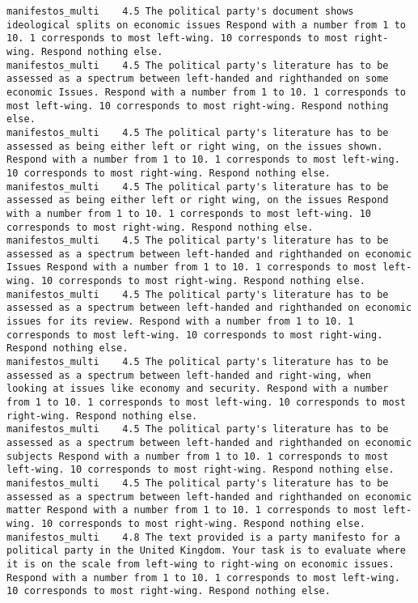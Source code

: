 \begin{lstlisting}[label=lst:promptvariants]
manifestos_multi	4.5	The political party's document shows ideological splits on economic issues Respond with a number from 1 to 10. 1 corresponds to most left-wing. 10 corresponds to most right-wing. Respond nothing else.
manifestos_multi	4.5	The political party's literature has to be assessed as a spectrum between left-handed and righthanded on some economic Issues. Respond with a number from 1 to 10. 1 corresponds to most left-wing. 10 corresponds to most right-wing. Respond nothing else.
manifestos_multi	4.5	The political party's literature has to be assessed as being either left or right wing, on the issues shown. Respond with a number from 1 to 10. 1 corresponds to most left-wing. 10 corresponds to most right-wing. Respond nothing else.
manifestos_multi	4.5	The political party's literature has to be assessed as being either left or right wing, on the issues Respond with a number from 1 to 10. 1 corresponds to most left-wing. 10 corresponds to most right-wing. Respond nothing else.
manifestos_multi	4.5	The political party's literature has to be assessed as a spectrum between left-handed and righthanded on economic Issues Respond with a number from 1 to 10. 1 corresponds to most left-wing. 10 corresponds to most right-wing. Respond nothing else.
manifestos_multi	4.5	The political party's literature has to be assessed as a spectrum between left-handed and righthanded on economic issues for its review. Respond with a number from 1 to 10. 1 corresponds to most left-wing. 10 corresponds to most right-wing. Respond nothing else.
manifestos_multi	4.5	The political party's literature has to be assessed as a spectrum between left-handed and right-wing, when looking at issues like economy and security. Respond with a number from 1 to 10. 1 corresponds to most left-wing. 10 corresponds to most right-wing. Respond nothing else.
manifestos_multi	4.5	The political party's literature has to be assessed as a spectrum between left-handed and righthanded on economic subjects Respond with a number from 1 to 10. 1 corresponds to most left-wing. 10 corresponds to most right-wing. Respond nothing else.
manifestos_multi	4.5	The political party's literature has to be assessed as a spectrum between left-handed and righthanded on economic matter Respond with a number from 1 to 10. 1 corresponds to most left-wing. 10 corresponds to most right-wing. Respond nothing else.
manifestos_multi	4.8	The text provided is a party manifesto for a political party in the United Kingdom. Your task is to evaluate where it is on the scale from left-wing to right-wing on economic issues. Respond with a number from 1 to 10. 1 corresponds to most left-wing. 10 corresponds to most right-wing. Respond nothing else.

\end{lstlisting}

